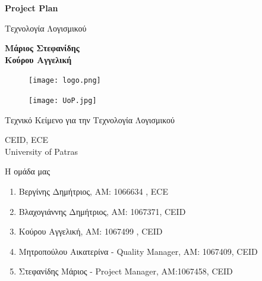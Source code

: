 \documentclass{article}
\begin{document}

\begin{titlepage}
   \begin{center}
       \vspace*{1cm}

       \textbf{\huge Project Plan}

       \vspace{0.5cm}
        Τεχνολογία Λογισμικού
            
       \vspace{1cm}

       \textbf{Μάριος Στεφανίδης\\Κούρου Αγγελική}
       
       
       \begin{figure}[!htb]
        \centering
        \texttt{[image: logo.png]}
        \end{figure}
        
        \vspace{0.5cm}
        
        \begin{figure}[!htb]
        \centering
        \texttt{[image: UoP.jpg]}
        \end{figure}


       \vfill
            
       Τεχνικό Κείμενο για την Τεχνολογία Λογισμικού\\
            
       \vspace{0.5cm}
            
       CEID, ECE\\
       University of Patras\\
            
   \end{center}
\end{titlepage}



\noindent Η ομάδα μας

\begin{enumerate}
  \item Βεργίνης Δημήτριος, ΑΜ: 1066634 , ECE
  \item Βλαχογιάννης Δημήτριος, ΑΜ: 1067371, CEID
  \item Κούρου Αγγελική, ΑΜ: 1067499 , CEID
  \item Μητροπούλου Αικατερίνα - Quality Manager, ΑΜ: 1067409, CEID
  \item Στεφανίδης Μάριος - Project Manager, ΑΜ:1067458, CEID
\end{enumerate}
\end{document}
